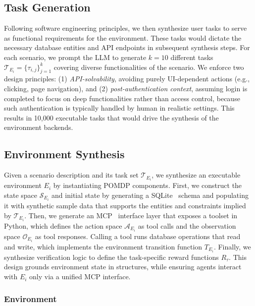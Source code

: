 \documentclass{article}
\theoremstyle{plain}
\theoremstyle{definition}
\theoremstyle{remark}
\begin{document}
\subsection{Task Generation} \label{sec:task_gen}
Following software engineering principles, we then synthesize user tasks to serve as functional requirements for the environment.
These tasks would dictate the necessary database entities and API endpoints in subsequent synthesis steps.
For each scenario, we prompt the LLM to generate $k=10$ different tasks $\mathcal{T}_{E_i} = \{\tau_{i,j}\}^k_{j=1}$ covering diverse functionalities of the scenario.
We enforce two design principles: (1) \textit{API-solvability}, avoiding purely UI-dependent actions (e.g., clicking, page navigation), and (2) \textit{post-authentication context}, assuming login is completed to focus on deep functionalities rather than access control, because such authentication is typically handled by human in realistic settings.
This results in 10,000 executable tasks that would drive the synthesis of the environment backends.




\subsection{Environment Synthesis} 
Given a scenario description and its task set $\mathcal{T}_{E_i}$, we synthesize an executable environment $E_i$ by instantiating POMDP components.
First, we construct the state space $\mathcal{S}_{E_i}$ and initial state by generating a SQLite~\citep{sqlite} schema and populating it with synthetic sample data that supports the entities and constraints implied by $\mathcal{T}_{E_i}$.
Then, we generate an MCP~\citep{anthropic_mcp_2024} interface layer that exposes a toolset in Python, which defines the action space $\mathcal{A}_{E_i}$ as tool calls and the observation space $\mathcal{O}_{E_i}$ as tool responses. Calling a tool runs database operations that read and write, which implements the environment transition function $T_{E_i}$.
Finally, we synthesize verification logic to define the task-specific reward functions $R_{\tau}$.
This design grounds environment state in structures, while ensuring agents interact with $E_i$ only via a unified MCP interface.

\subsubsection{Environment} \label{sec:environment}
\end{document}
